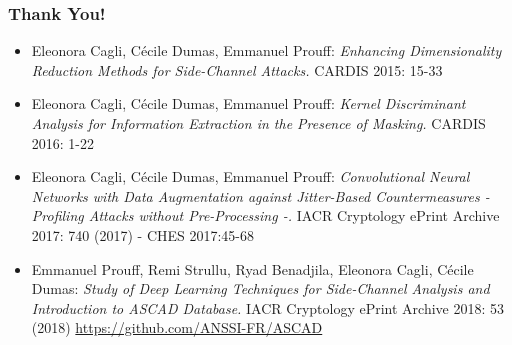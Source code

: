 \begin{frame}
\frametitle{Thank You!}

\begin{itemize}
\item Eleonora Cagli, Cécile Dumas, Emmanuel Prouff:
\emph{Enhancing Dimensionality Reduction Methods for Side-Channel Attacks.} CARDIS 2015: 15-33
\item Eleonora Cagli, Cécile Dumas, Emmanuel Prouff:
\emph{Kernel Discriminant Analysis for Information Extraction in the Presence of Masking.} CARDIS 2016: 1-22
\item  Eleonora Cagli, Cécile Dumas, Emmanuel Prouff:
\emph{Convolutional Neural Networks with Data Augmentation against Jitter-Based Countermeasures - Profiling Attacks without Pre-Processing -.} IACR Cryptology ePrint Archive 2017: 740 (2017) - CHES 2017:45-68
\item Emmanuel Prouff, Remi Strullu, Ryad Benadjila, Eleonora Cagli, Cécile Dumas:
\emph{Study of Deep Learning Techniques for Side-Channel Analysis and Introduction to ASCAD Database.} IACR Cryptology ePrint Archive 2018: 53 (2018) \url{https://github.com/ANSSI-FR/ASCAD}
\end{itemize}

\end{frame}

